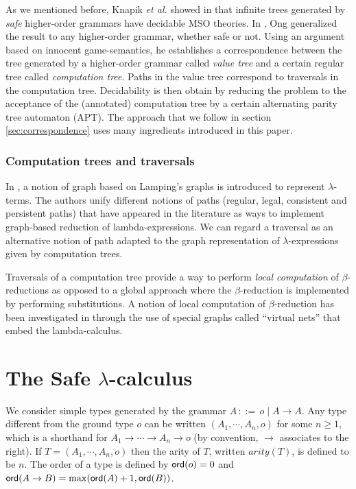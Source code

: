 \documentclass{llncs}
\newcommand\ord[1]{{\sf ord}(#1)}
\newcommand{\funsp}{\rightarrow}
\begin{document}
As we mentioned before, Knapik \emph{et al.} showed in \cite{KNU02} that infinite trees generated by \emph{safe} higher-order grammars
have decidable MSO theories. In \cite{OngLics2006}, Ong generalized the result to any higher-order grammar, whether safe or not.
Using an argument based on innocent game-semantics, he establishes a correspondence between the tree generated by a higher-order grammar called \emph{value tree} and a certain regular tree called \emph{computation tree}. Paths in the value tree correspond to traversals in the computation tree. Decidability is then obtain by reducing the problem to the acceptance of the (annotated) computation tree by a certain alternating parity tree automaton (APT). The approach that we follow in section \ref{sec:correspondence} uses many ingredients introduced in this paper.


\subsubsection{Computation trees and traversals}

In \cite{DBLP:conf/lics/AspertiDLR94}, a notion of graph based on
Lamping's graphs \cite{lamping} is introduced to represent
$\lambda$-terms. The authors unify different notions of paths
(regular, legal, consistent and persistent paths) that have appeared
in the literature as ways to implement graph-based reduction of
lambda-expressions. We can regard a traversal as an alternative
notion of path adapted to the graph representation of
$\lambda$-expressions given by computation trees.

Traversals of a computation tree provide a way
to perform \emph{local computation} of $\beta$-reductions as opposed
to a global approach where the $\beta$-reduction is implemented by
performing substitutions. A notion of local computation of
$\beta$-reduction has been investigated in
\cite{DanosRegnier-Localandasynchronou} through the use of special
graphs called ``virtual nets'' that embed the lambda-calculus.


\section{The Safe $\lambda$-calculus}
We consider simple types generated by the grammar $A
\, ::= \, o \; | \; A \funsp A$. Any type different from the ground
type $o$ can be written $(A_1, \cdots, A_n, o)$ for some $n \geq 1$,
which is a shorthand for $A_1 \funsp \cdots \funsp A_n \funsp o$ (by
convention, $\rightarrow$ associates to the right). If $T=(A_1,
\cdots, A_n, o)$ then the arity of $T$, written $arity(T)$, is
defined to be $n$.
The order of a type is defined by $\ord{o} = 0$ and
$\ord{A \funsp B} = \max(\ord{A}+1, \ord{B})$.
\end{document}
